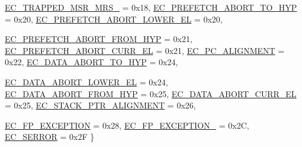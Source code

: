 \begin{DoxyCompactItemize}
\hyperlink{namespaceArmISA_a04034d12009cf36227f4d2abff3331a2a9baaefdbd9a6dc2c2ad52469ac271048}{EC\_\-TRAPPED\_\-MSR\_\-MRS\_} =  0x18, 
\hyperlink{namespaceArmISA_a04034d12009cf36227f4d2abff3331a2a8eb8aefa440199a7e5bf080d3b21691b}{EC\_\-PREFETCH\_\-ABORT\_\-TO\_\-HYP} =  0x20, 
\hyperlink{namespaceArmISA_a04034d12009cf36227f4d2abff3331a2a85d1bfee43f81baa6bde085a67ace55a}{EC\_\-PREFETCH\_\-ABORT\_\-LOWER\_\-EL} =  0x20, 
\par
\hyperlink{namespaceArmISA_a04034d12009cf36227f4d2abff3331a2a5c0e47202d7023a9c8b4de92587f1dd0}{EC\_\-PREFETCH\_\-ABORT\_\-FROM\_\-HYP} =  0x21, 
\hyperlink{namespaceArmISA_a04034d12009cf36227f4d2abff3331a2a155c9559ed5dc3238ccbbfb7a2d9a6f9}{EC\_\-PREFETCH\_\-ABORT\_\-CURR\_\-EL} =  0x21, 
\hyperlink{namespaceArmISA_a04034d12009cf36227f4d2abff3331a2a75149b7e958cccb098911610c7e3c5f3}{EC\_\-PC\_\-ALIGNMENT} =  0x22, 
\hyperlink{namespaceArmISA_a04034d12009cf36227f4d2abff3331a2a7b0653f80bb90c2e31d113d9aac4432f}{EC\_\-DATA\_\-ABORT\_\-TO\_\-HYP} =  0x24, 
\par
\hyperlink{namespaceArmISA_a04034d12009cf36227f4d2abff3331a2adcc119883ef5b0ecaa996fb5373342bc}{EC\_\-DATA\_\-ABORT\_\-LOWER\_\-EL} =  0x24, 
\hyperlink{namespaceArmISA_a04034d12009cf36227f4d2abff3331a2a92e84b40cfec1527b9b54dfa2e2a88d5}{EC\_\-DATA\_\-ABORT\_\-FROM\_\-HYP} =  0x25, 
\hyperlink{namespaceArmISA_a04034d12009cf36227f4d2abff3331a2a6b64c1b28c9e6af76ed5244ba4251012}{EC\_\-DATA\_\-ABORT\_\-CURR\_\-EL} =  0x25, 
\hyperlink{namespaceArmISA_a04034d12009cf36227f4d2abff3331a2a6cef60a154b3cb8970e02e6ae5e902ac}{EC\_\-STACK\_\-PTR\_\-ALIGNMENT} =  0x26, 
\par
\hyperlink{namespaceArmISA_a04034d12009cf36227f4d2abff3331a2a7e6380074c805b974c723ed1a4be826f}{EC\_\-FP\_\-EXCEPTION} =  0x28, 
\hyperlink{namespaceArmISA_a04034d12009cf36227f4d2abff3331a2accd6c48159f39a5efa4ca6d157bff15a}{EC\_\-FP\_\-EXCEPTION\_} =  0x2C, 
\hyperlink{namespaceArmISA_a04034d12009cf36227f4d2abff3331a2ae30677527e11026b332cbbb739bdad70}{EC\_\-SERROR} =  0x2F
 \}
\end{DoxyCompactItemize}
